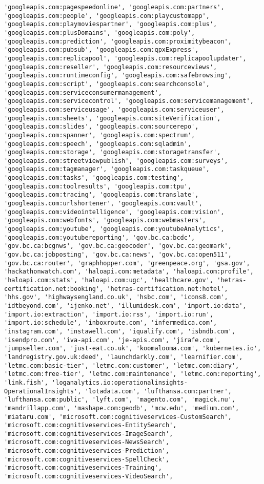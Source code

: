 \documentclass[11pt]{article}
\begin{document}
\begin{Verbatim}[commandchars=\\\{\}]
'googleapis.com:pagespeedonline', 'googleapis.com:partners', 'googleapis.com:people', 'googleapis.com:playcustomapp', 'googleapis.com:playmoviespartner', 'googleapis.com:plus', 'googleapis.com:plusDomains', 'googleapis.com:poly', 'googleapis.com:prediction', 'googleapis.com:proximitybeacon', 'googleapis.com:pubsub', 'googleapis.com:qpxExpress', 'googleapis.com:replicapool', 'googleapis.com:replicapoolupdater', 'googleapis.com:reseller', 'googleapis.com:resourceviews', 'googleapis.com:runtimeconfig', 'googleapis.com:safebrowsing', 'googleapis.com:script', 'googleapis.com:searchconsole', 'googleapis.com:serviceconsumermanagement', 'googleapis.com:servicecontrol', 'googleapis.com:servicemanagement', 'googleapis.com:serviceusage', 'googleapis.com:serviceuser', 'googleapis.com:sheets', 'googleapis.com:siteVerification', 'googleapis.com:slides', 'googleapis.com:sourcerepo', 'googleapis.com:spanner', 'googleapis.com:spectrum', 'googleapis.com:speech', 'googleapis.com:sqladmin', 'googleapis.com:storage', 'googleapis.com:storagetransfer', 'googleapis.com:streetviewpublish', 'googleapis.com:surveys', 'googleapis.com:tagmanager', 'googleapis.com:taskqueue', 'googleapis.com:tasks', 'googleapis.com:testing', 'googleapis.com:toolresults', 'googleapis.com:tpu', 'googleapis.com:tracing', 'googleapis.com:translate', 'googleapis.com:urlshortener', 'googleapis.com:vault', 'googleapis.com:videointelligence', 'googleapis.com:vision', 'googleapis.com:webfonts', 'googleapis.com:webmasters', 'googleapis.com:youtube', 'googleapis.com:youtubeAnalytics', 'googleapis.com:youtubereporting', 'gov.bc.ca:bcdc', 'gov.bc.ca:bcgnws', 'gov.bc.ca:geocoder', 'gov.bc.ca:geomark', 'gov.bc.ca:jobposting', 'gov.bc.ca:news', 'gov.bc.ca:open511', 'gov.bc.ca:router', 'graphhopper.com', 'greenpeace.org', 'gsa.gov', 'hackathonwatch.com', 'haloapi.com:metadata', 'haloapi.com:profile', 'haloapi.com:stats', 'haloapi.com:ugc', 'healthcare.gov', 'hetras-certification.net:booking', 'hetras-certification.net:hotel', 'hhs.gov', 'highwaysengland.co.uk', 'hsbc.com', 'icons8.com', 'idtbeyond.com', 'ijenko.net', 'illumidesk.com', 'import.io:data', 'import.io:extraction', 'import.io:rss', 'import.io:run', 'import.io:schedule', 'inboxroute.com', 'infermedica.com', 'instagram.com', 'instawell.com', 'iqualify.com', 'isbndb.com', 'isendpro.com', 'iva-api.com', 'je-apis.com', 'jirafe.com', 'jumpseller.com', 'just-eat.co.uk', 'koomalooma.com', 'kubernetes.io', 'landregistry.gov.uk:deed', 'launchdarkly.com', 'learnifier.com', 'letmc.com:basic-tier', 'letmc.com:customer', 'letmc.com:diary', 'letmc.com:free-tier', 'letmc.com:maintenance', 'letmc.com:reporting', 'link.fish', 'loganalytics.io:operationalinsights-OperationalInsights', 'lotadata.com', 'lufthansa.com:partner', 'lufthansa.com:public', 'lyft.com', 'magento.com', 'magick.nu', 'mandrillapp.com', 'mashape.com:geodb', 'mcw.edu', 'medium.com', 'miataru.com', 'microsoft.com:cognitiveservices-CustomSearch', 'microsoft.com:cognitiveservices-EntitySearch', 'microsoft.com:cognitiveservices-ImageSearch', 'microsoft.com:cognitiveservices-NewsSearch', 'microsoft.com:cognitiveservices-Prediction', 'microsoft.com:cognitiveservices-SpellCheck', 'microsoft.com:cognitiveservices-Training', 'microsoft.com:cognitiveservices-VideoSearch', 
\end{Verbatim}
\end{document}
